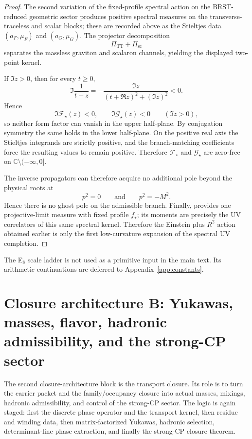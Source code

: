 \begin{proof}
The second variation of the fixed-profile spectral action on the BRST-reduced geometric sector
produces positive spectral measures on the transverse-traceless and scalar blocks; these are
recorded above as the Stieltjes data $(a_F,\mu_F)$ and $(a_G,\mu_G)$. The projector decomposition
\[
\Pi_{\mathrm{TT}}+\Pi_{\mathrm{sc}}
\]
separates the massless graviton and scalaron channels, yielding the displayed two-point kernel.

If $\Im z>0$, then for every $t\ge 0$,
\[
\Im\frac{1}{t+z}
=
-\frac{\Im z}{(t+\Re z)^2+(\Im z)^2}
<0.
\]
Hence
\[
\Im \mathcal F_\star(z)<0,
\qquad
\Im \mathcal G_\star(z)<0
\qquad
(\Im z>0),
\]
so neither form factor can vanish in the upper half-plane. By conjugation symmetry the same holds
in the lower half-plane. On the positive real axis the Stieltjes integrands are strictly positive,
and the branch-matching coefficients force the resulting values to remain positive. Therefore
$\mathcal F_\star$ and $\mathcal G_\star$ are zero-free on
$\mathbb C\setminus(-\infty,0]$.

The inverse propagators can therefore acquire no additional pole beyond the physical roots at
\[
p^2=0
\qquad\text{and}\qquad
p^2=-M^2.
\]
Hence there is no ghost pole on the admissible branch. Finally,
 provides one projective-limit measure with fixed profile
$f_\star$; its moments are precisely the UV correlators of this same spectral kernel. Therefore the
Einstein plus $R^2$ action obtained earlier is only the first low-curvature expansion of the
spectral UV completion.
\end{proof}

The E$_8$ scale ladder is not used as a primitive input in the main text. Its arithmetic
continuations are deferred to Appendix~\ref{app:constants}.

\section{Closure architecture B: Yukawas, masses, flavor, hadronic admissibility, and the strong-CP sector}

The second closure-architecture block is the transport closure. Its role is to turn the carrier
packet and the family/occupancy closure into actual masses, mixings, hadronic admissibility, and
control of the strong-CP sector. The logic is again staged: first the discrete phase operator and
the transport kernel, then residue and winding data, then matrix-factorized Yukawas, hadronic
selection, determinant-line phase extraction, and finally the strong-CP closure theorem.


